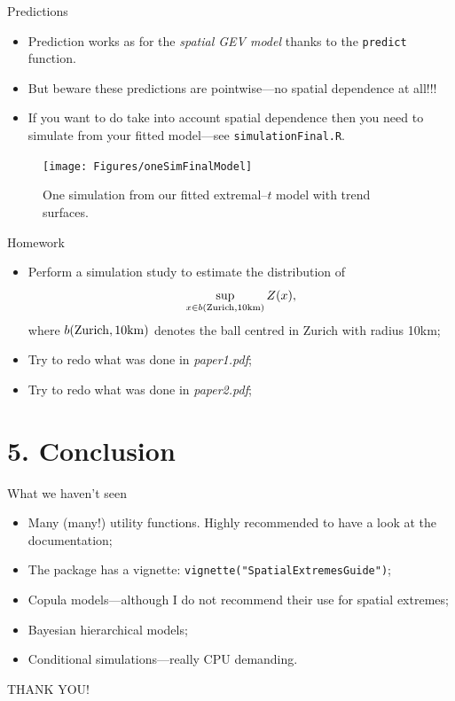 \documentclass[blackslide,style=simple]{powerdot}
\theoremstyle{plain}%
\theoremstyle{definition}
\theoremstyle{remark}
\begin{document}
\begin{wideslide}{Predictions}
  \begin{itemize}
  \item Prediction works as for the \emph{spatial GEV model} thanks to
    the \texttt{predict} function.
  \item But beware these predictions are pointwise---no spatial
    dependence at all!!!
  \item If you want to do take into account spatial dependence then
    you need to simulate from your fitted model---see
    \texttt{simulationFinal.R}.
  \end{itemize}
  \vspace*{-2em}
  \begin{figure}
    \centering
    \texttt{[image: Figures/oneSimFinalModel]}
    \caption{One simulation from our fitted extremal--$t$ model with trend surfaces.}
  \end{figure}
\end{wideslide}

\begin{slide}{Homework}
  \begin{itemize}
  \item Perform a simulation study to estimate the distribution of
    \begin{equation*}
      \sup_{x \in b({\rm Zurich}, 10{\rm km})} Z(x),
    \end{equation*}
    where $b({\rm Zurich}, 10{\rm km})$ denotes the ball centred in
    Zurich with radius 10km;
  \item Try to redo what was done in \emph{paper1.pdf};
  \item Try to redo what was done in \emph{paper2.pdf};
  \end{itemize}
\end{slide}

\section{5. Conclusion}

\begin{wideslide}[toc=]{What we haven't seen}
  \begin{itemize}
  \item Many (many!) utility functions. Highly recommended to have a
    look at the documentation;
  \item The package has a vignette: \texttt{vignette("SpatialExtremesGuide")};
  \item Copula models---although I do not recommend their use for
    spatial extremes;
  \item Bayesian hierarchical models;
  \item Conditional simulations---really CPU demanding. 
  \end{itemize}
  \pause
  \vfill
  \begin{center}
    \Large THANK YOU!
  \end{center}
  \vfill
\end{wideslide}
\end{document}
